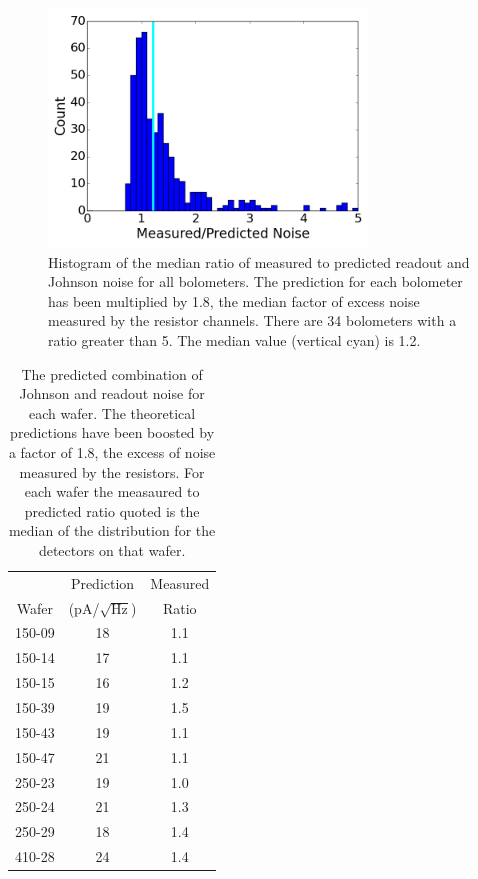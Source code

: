 \begin{figure}[htp]
\begin{center}
\includegraphics[height=2.5in]{figures/overbias_noise_ratios_histogram}
\caption[In-flight overbiased noise histograms]{Histogram of the median ratio of measured to predicted readout and Johnson noise for all bolometers. 
The prediction for each bolometer has been multiplied by 1.8, the median factor of excess noise measured by the resistor channels. 
There are 34 bolometers with a ratio greater than 5.
The median value (vertical cyan) is 1.2. 
\label{fig:overbias_noise_hist} }
\end{center}
\end{figure}

\begin{table}[htp]
\begin{center}
\begin{tabular}{| c | c | c |}
\hline  
           & Prediction           & Measured   \\
Wafer & (pA/$\sqrt{\mathrm{Hz}}$) & Ratio  \\
\hline 150-09 & 18 &  1.1 \\ 
\hline 150-14 & 17 &  1.1 \\ 
\hline 150-15 & 16 &  1.2 \\ 
\hline 150-39 & 19 &  1.5 \\ 
\hline 150-43 & 19 &  1.1 \\
\hline 150-47 & 21 &  1.1 \\
\hline 250-23 & 19 &  1.0 \\ 
\hline 250-24 & 21 &  1.3 \\ 
\hline 250-29 & 18 &  1.4 \\
\hline 410-28 & 24 &  1.4 \\
\hline
\end{tabular}
\end{center}
\caption[Median overbiased NEP predictions and ratio of measurement to prediction for each wafer]{The predicted combination of Johnson and readout noise for each wafer. The theoretical predictions have been boosted by a factor of 1.8, the excess of noise measured by the resistors. For each wafer the measaured to predicted ratio quoted is the median of the distribution for the detectors on that wafer. 
\label{tab:overbias_noise_table} }
\end{table}

